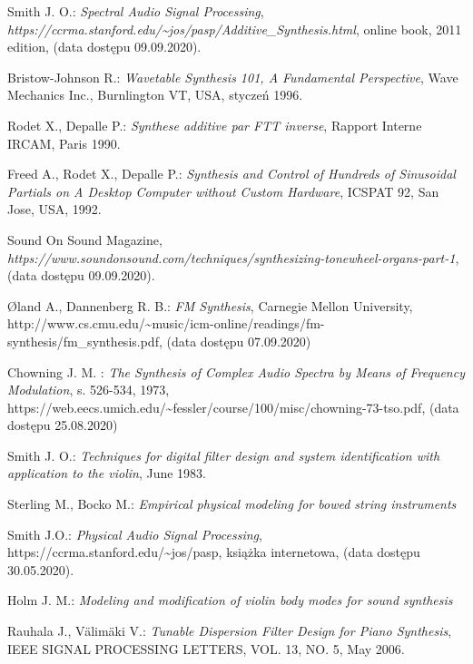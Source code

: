 \documentclass[nostrict]{szablonPG}
\begin{document}
\begin{thebibliography}{20}
		Smith J. O.: \emph{Spectral Audio Signal Processing}, \emph{https://ccrma.stanford.edu/\textasciitilde jos/pasp/Additive\_Synthesis.html}, online book, 2011 edition, (data dostępu 09.09.2020).
		
		Bristow-Johnson R.: \emph{Wavetable Synthesis 101, A Fundamental Perspective}, Wave Mechanics Inc., Burnlington VT, USA, styczeń 1996.
		
		Rodet X., Depalle P.: \emph{Synthese additive par FTT inverse}, Rapport Interne IRCAM, Paris 1990.
		
		Freed A., Rodet X., Depalle P.: \emph{Synthesis and Control of Hundreds of Sinusoidal Partials on A Desktop Computer without Custom Hardware}, ICSPAT 92, San Jose, USA, 1992.
		
		Sound On Sound Magazine, \emph{https://www.soundonsound.com/techniques/synthesizing-tonewheel-organs-part-1}, (data dostępu 09.09.2020).
		
		Øland A., Dannenberg R. B.: \emph{FM Synthesis}, Carnegie Mellon University, http://www.cs.cmu.edu/\textasciitilde music/icm-online/readings/fm-synthesis/fm\_synthesis.pdf, (data dostępu 07.09.2020)
		
		Chowning J. M. : \emph{The Synthesis of Complex Audio Spectra by Means of Frequency Modulation}, s. 526-534, 1973, https://web.eecs.umich.edu/\textasciitilde fessler/course/100/misc/chowning-73-tso.pdf, (data dostępu 25.08.2020)
		

		
		Smith J. O.: \emph{Techniques for digital filter design and system identification with application to the violin}, June 1983.
		
		Sterling M., Bocko M.: \emph{Empirical physical modeling for bowed string instruments}
		
		Smith J.O.: \emph{Physical Audio Signal Processing}, https://ccrma.stanford.edu/\textasciitilde jos/pasp, książka internetowa, (data dostępu 30.05.2020).
		
		Holm J. M.: \emph{Modeling and modification of violin body modes for sound synthesis}
			
		Rauhala J., Välimäki V.: \emph{Tunable Dispersion Filter Design for Piano Synthesis}, IEEE SIGNAL PROCESSING LETTERS, VOL. 13, NO. 5, May 2006.
		

\end{thebibliography}
\end{document}
